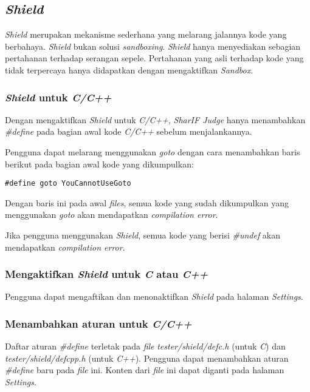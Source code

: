 \subsection{\textit{Shield}}
\label{subsubsec:shield}
\textit{Shield} merupakan mekanisme sederhana yang melarang jalannya kode yang berbahaya. \textit{Shield} bukan solusi \textit{sandboxing}. \textit{Shield} hanya menyediakan sebagian pertahanan terhadap serangan sepele. Pertahanan yang asli terhadap kode yang tidak terpercaya hanya didapatkan dengan mengaktifkan \textit{Sandbox}.

\subsubsection{\textit{Shield} untuk \textit{C/C++}}
\label{subsubsec:shield_c/c++}
Dengan mengaktifkan \textit{Shield} untuk \textit{C/C++}, \textit{SharIF Judge} hanya menambahkan \textit{\#define} pada bagian awal kode \textit{C/C++} sebelum menjalankannya.

Pengguna dapat melarang menggunakan \textit{goto} dengan cara menambahkan baris berikut pada bagian awal kode yang dikumpulkan:

\begin{lstlisting}[basicstyle=\ttfamily, frame=single,
columns=fullflexible, keepspaces=true, breaklines=true, label=ls:19]
#define goto YouCannotUseGoto
\end{lstlisting}

Dengan baris ini pada awal \textit{files}, semua kode yang sudah dikumpulkan yang menggunakan \textit{goto} akan mendapatkan \textit{compilation error}.

Jika pengguna menggunakan \textit{Shield}, semua kode yang berisi \textit{\#undef} akan mendapatkan \textit{compilation error}.

\subsubsection{Mengaktifkan \textit{Shield} untuk \textit{C} atau \textit{C++}}
\label{subsubsec:mengaktifkan_shield_c/c++}
Pengguna dapat mengaftikan dan menonaktifkan \textit{Shield} pada halaman \textit{Settings}.

\subsubsection{Menambahkan aturan untuk \textit{C/C++}}
\label{subsubsec:menambah_aturan_c/c++}
Daftar aturan \textit{\#define} terletak pada \textit{file} \textit{tester/shield/defc.h} (untuk \textit{C}) dan \textit{tester/shield/defcpp.h} (untuk \textit{C++}). Pengguna dapat menambahkan aturan \textit{\#define} baru pada \textit{file} ini. Konten dari \textit{file} ini dapat diganti pada halaman \textit{Settings}.

